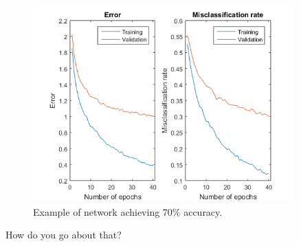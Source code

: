 \documentclass[a4paper,11pt]{article}
\begin{document}
\begin{figure}[h]
	\centering
	\includegraphics[width=0.9\textwidth]{training_loss.png}
	\caption{Example of network achieving 70\% accuracy.}
\end{figure}

How do you go about that? 
\end{document}
